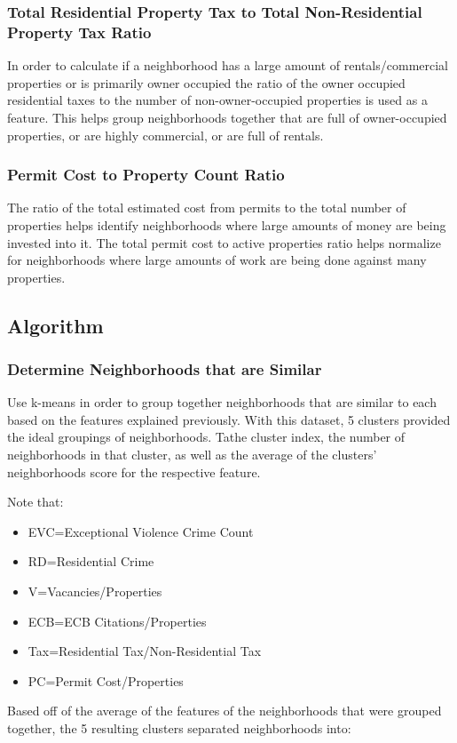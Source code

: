 \documentclass[conference]{IEEEtran}
\begin{document}
\subsubsection{Total Residential Property Tax to Total Non-Residential Property Tax Ratio}
In order to calculate if a neighborhood has a large amount of rentals/commercial properties or is primarily owner occupied
the ratio of the owner occupied residential taxes to the number of non-owner-occupied properties is used as a feature.
This helps group neighborhoods together that are full of owner-occupied properties, or are highly commercial, or are full
of rentals.

\subsubsection{Permit Cost to Property Count Ratio}
The ratio of the total estimated cost from permits to the total number of properties helps identify neighborhoods where
large amounts of money are being invested into it.  The total permit cost to active properties ratio helps normalize for neighborhoods
where large amounts of work are being done against many properties.

\subsection{Algorithm}

\subsubsection{Determine Neighborhoods that are Similar}
Use k-means in order to group together neighborhoods that are similar to each based on the features explained previously.
With this dataset, 5 clusters provided the ideal groupings of neighborhoods.  Tathe cluster
index, the number of neighborhoods in that cluster, as well as the average of the clusters' neighborhoods score for the respective
feature.

Note that:
\begin{itemize}
	\item EVC=Exceptional Violence Crime Count
	\item RD=Residential Crime
    \item V=Vacancies/Properties
    \item ECB=ECB Citations/Properties
    \item Tax=Residential Tax/Non-Residential Tax
    \item PC=Permit Cost/Properties
\end{itemize}
Based off of the average of the features of the
neighborhoods that were grouped together, the 5 resulting clusters separated neighborhoods into:
\end{document}

